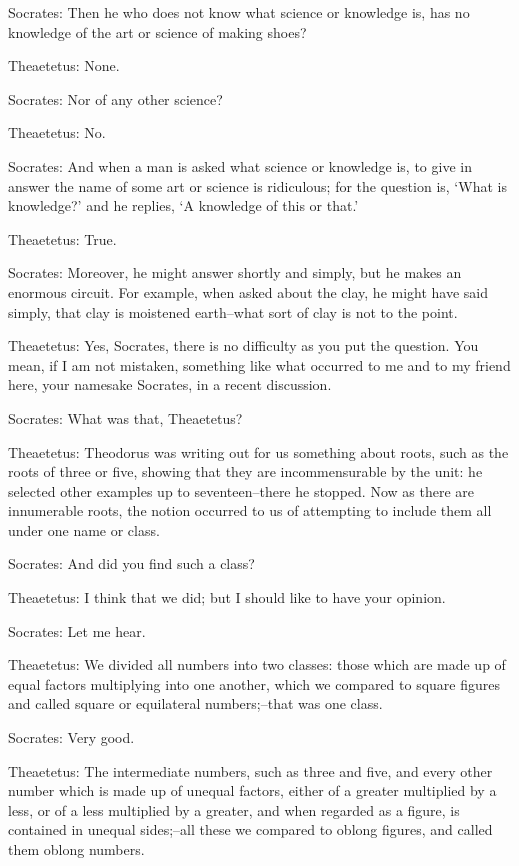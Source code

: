 Socrates: Then he who does not know what science or knowledge is, has no
knowledge of the art or science of making shoes?

Theaetetus: None.

Socrates: Nor of any other science?

Theaetetus: No.

Socrates: And when a man is asked what science or knowledge is, to
give in answer the name of some art or science is ridiculous; for the
question is, `What is knowledge?' and he replies, `A knowledge of this
or that.'

Theaetetus: True.

Socrates: Moreover, he might answer shortly and simply, but he makes an
enormous circuit. For example, when asked about the clay, he might have
said simply, that clay is moistened earth--what sort of clay is not to
the point.

Theaetetus: Yes, Socrates, there is no difficulty as you put the
question. You mean, if I am not mistaken, something like what occurred
to me and to my friend here, your namesake Socrates, in a recent
discussion.

Socrates: What was that, Theaetetus?

Theaetetus: Theodorus was writing out for us something about roots, such
as the roots of three or five, showing that they are incommensurable by
the unit: he selected other examples up to seventeen--there he stopped.
Now as there are innumerable roots, the notion occurred to us of
attempting to include them all under one name or class.

Socrates: And did you find such a class?

Theaetetus: I think that we did; but I should like to have your opinion.

Socrates: Let me hear.

Theaetetus: We divided all numbers into two classes: those which are
made up of equal factors multiplying into one another, which we compared
to square figures and called square or equilateral numbers;--that was
one class.

Socrates: Very good.

Theaetetus: The intermediate numbers, such as three and five, and every
other number which is made up of unequal factors, either of a greater
multiplied by a less, or of a less multiplied by a greater, and when
regarded as a figure, is contained in unequal sides;--all these we
compared to oblong figures, and called them oblong numbers.

